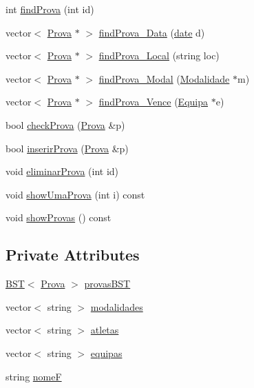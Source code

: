 \begin{DoxyCompactItemize}
\item 
int \hyperlink{class_calendario_a0232407ed153d613706113bad31d63ab}{find\+Prova} (int id)
\item 
vector$<$ \hyperlink{class_prova}{Prova} $\ast$ $>$ \hyperlink{class_calendario_acb99bce549da591f00766bde187c6ec2}{find\+Prova\+\_\+\+Data} (\hyperlink{structdate}{date} d)
\item 
vector$<$ \hyperlink{class_prova}{Prova} $\ast$ $>$ \hyperlink{class_calendario_a793b4bc54543406742b0fcd16bd95c26}{find\+Prova\+\_\+\+Local} (string loc)
\item 
vector$<$ \hyperlink{class_prova}{Prova} $\ast$ $>$ \hyperlink{class_calendario_a4213931fe492f55a4b6981c3dca02479}{find\+Prova\+\_\+\+Modal} (\hyperlink{class_modalidade}{Modalidade} $\ast$m)
\item 
vector$<$ \hyperlink{class_prova}{Prova} $\ast$ $>$ \hyperlink{class_calendario_a269e064b1ef6d757eff9b3bd185c6542}{find\+Prova\+\_\+\+Vence} (\hyperlink{class_equipa}{Equipa} $\ast$e)
\item 
bool \hyperlink{class_calendario_a912aa3dbadbdd82a002ccb251d5281fc}{check\+Prova} (\hyperlink{class_prova}{Prova} \&p)
\item 
bool \hyperlink{class_calendario_a625c94503c65e12e0999b2e022f364c5}{inserir\+Prova} (\hyperlink{class_prova}{Prova} \&p)
\item 
void \hyperlink{class_calendario_a113deec80be420c7d7aabb416fe2e763}{eliminar\+Prova} (int id)
\item 
void \hyperlink{class_calendario_ae65b9add220bbfdf1f029816333aa656}{show\+Uma\+Prova} (int i) const 
\item 
void \hyperlink{class_calendario_af6bfda8df20c96b8e77773de3da16cee}{show\+Provas} () const 
\end{DoxyCompactItemize}
\subsection*{Private Attributes}
\begin{DoxyCompactItemize}
\item 
\hyperlink{class_b_s_t}{B\+S\+T}$<$ \hyperlink{class_prova}{Prova} $>$ \hyperlink{class_calendario_a4caf77f388a6250cfb463e11ff869519}{provas\+B\+S\+T}
\item 
vector$<$ string $>$ \hyperlink{class_calendario_a6a492724444ed6b468fe230d09fd800b}{modalidades}
\item 
vector$<$ string $>$ \hyperlink{class_calendario_abac0d74a48d544302a57fd3857ce3cf2}{atletas}
\item 
vector$<$ string $>$ \hyperlink{class_calendario_a4c49ca003a72d9d1aa32fcef57066467}{equipas}
\item 
string \hyperlink{class_calendario_ad14a413cc8b38380f6ea80f921cd16b4}{nome\+F}
\end{DoxyCompactItemize}


